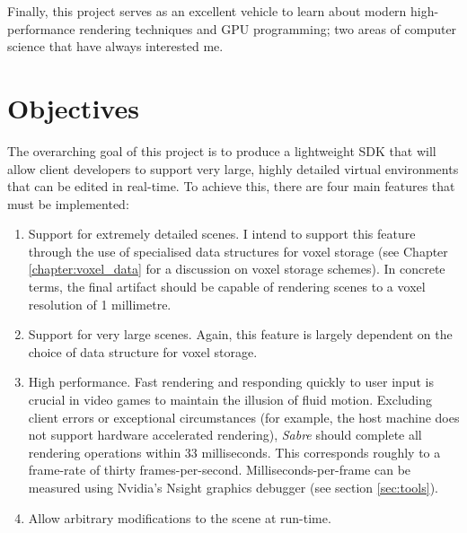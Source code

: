 Finally, this project serves as an excellent vehicle to learn about modern high-performance rendering techniques and GPU programming; two areas of computer science that have always interested me.

\section{Objectives}
The overarching goal of this project is to produce a lightweight SDK that will allow  client developers to support very large, highly detailed virtual environments that can be edited in real-time. To achieve this, there are four main features that must be implemented:

\begin{enumerate}
    \item Support for extremely detailed scenes. I intend to support this feature through the use of specialised data structures for voxel storage (see Chapter \ref{chapter:voxel_data} for a discussion on voxel storage schemes). In concrete terms, the final artifact should be capable of rendering scenes to a voxel resolution of 1 millimetre.
    
    \item Support for very large scenes. Again, this feature is largely dependent on the choice of data structure for voxel storage.
    
    \item High performance. Fast rendering and responding quickly to user input is crucial in video games to maintain the illusion of fluid motion. Excluding client errors or exceptional circumstances (for example, the host machine does not support hardware accelerated rendering), \textit{Sabre} should complete all rendering operations within 33 milliseconds. This corresponds roughly to a frame-rate of thirty frames-per-second. Milliseconds-per-frame can be measured using Nvidia's Nsight graphics debugger (see section \ref{sec:tools}).
    
    \item Allow arbitrary modifications to the scene at run-time.
\end{enumerate}